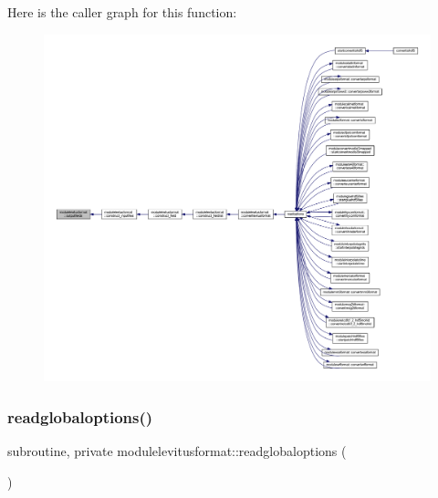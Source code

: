 Here is the caller graph for this function\+:\nopagebreak
\begin{figure}[H]
\begin{center}
\leavevmode
\includegraphics[width=350pt]{namespacemodulelevitusformat_aabed50c7effe5d563a35ce0013a4ec93_icgraph}
\end{center}
\end{figure}
\mbox{\label{namespacemodulelevitusformat_a3776b26027a1df5b06714f551024abed}} 
\subsubsection{\texorpdfstring{readglobaloptions()}{readglobaloptions()}}
{\footnotesize\ttfamily subroutine, private modulelevitusformat\+::readglobaloptions (\begin{DoxyParamCaption}{ }\end{DoxyParamCaption})\hspace{0.3cm}{\ttfamily [private]}}

